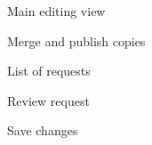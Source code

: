 



\begin{figure}[hp!]
 \centering
 \caption{Main editing view}
 \label{fig:main-editing-view}
\end{figure}

\begin{figure}[hp!]
 \centering
 \caption{Merge and publish copies}
\end{figure}

\begin{figure}[hp!]
 \centering
 \caption{List of requests}
\end{figure}

\begin{figure}[hp!]
 \centering
 \caption{Review request}
\end{figure}

\begin{figure}[hp!]
 \centering
 \caption{Save changes}
 \label{fig:save-changes}
\end{figure}
